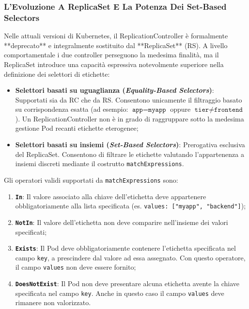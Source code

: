 \documentclass[11pt, a4paper]{article}
\begin{document}
\subsubsection{L'Evoluzione A ReplicaSet E La Potenza Dei Set-Based Selectors}
Nelle attuali versioni di Kubernetes, il ReplicationController è formalmente **deprecato** e integralmente sostituito dal **ReplicaSet** (RS). A livello comportamentale i due controller perseguono la medesima finalità, ma il ReplicaSet introduce una capacità espressiva notevolmente superiore nella definizione dei selettori di etichette:
\begin{itemize}[noitemsep]
    \item \textbf{Selettori basati su uguaglianza (\emph{Equality-Based Selectors})}: Supportati sia da RC che da RS. Consentono unicamente il filtraggio basato su corrispondenza esatta (ad esempio: $\texttt{app} = \texttt{myapp}$ oppure $\texttt{tier} \neq \texttt{frontend}$). Un ReplicationController non è in grado di raggruppare sotto la medesima gestione Pod recanti etichette eterogenee;
    \item \textbf{Selettori basati su insiemi (\emph{Set-Based Selectors})}: Prerogativa esclusiva del ReplicaSet. Consentono di filtrare le etichette valutando l'appartenenza a insiemi discreti mediante il costrutto \texttt{matchExpressions}.
\end{itemize}

Gli operatori validi supportati da \texttt{matchExpressions} sono:
\begin{enumerate}[noitemsep]
    \item \textbf{\texttt{In}}: Il valore associato alla chiave dell'etichetta deve appartenere obbligatoriamente alla lista specificata (es. \texttt{values: ["myapp", "backend"]});
    \item \textbf{\texttt{NotIn}}: Il valore dell'etichetta non deve comparire nell'insieme dei valori specificati;
    \item \textbf{\texttt{Exists}}: Il Pod deve obbligatoriamente contenere l'etichetta specificata nel campo \texttt{key}, a prescindere dal valore ad essa assegnato. Con questo operatore, il campo \texttt{values} non deve essere fornito;
    \item \textbf{\texttt{DoesNotExist}}: Il Pod non deve presentare alcuna etichetta avente la chiave specificata nel campo \texttt{key}. Anche in questo caso il campo \texttt{values} deve rimanere non valorizzato.
\end{enumerate}
\end{document}
